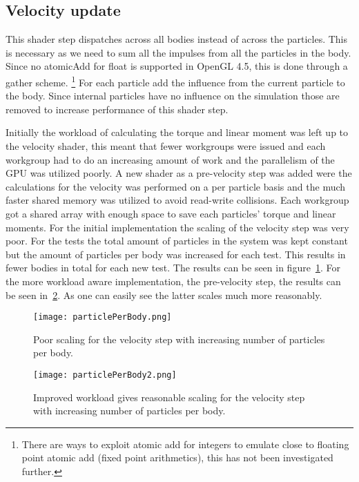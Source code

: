 \subsection{Velocity update}
This shader step dispatches across all bodies instead of across the particles. This
is necessary as we need to sum all the impulses from all the particles in the body.
Since no atomicAdd for float is supported in OpenGL 4.5, this is done through a gather scheme.
\footnote{There are ways to exploit atomic add for integers to emulate close to floating point atomic add (fixed point arithmetics), this has not been investigated further.}
For each particle add the influence from the current particle to the body.
Since internal particles have no influence on the simulation
those are removed to increase performance of this shader step.

Initially the workload of calculating the torque and linear moment was left up to the velocity shader,
this meant that fewer workgroups were issued and each workgroup had to do an increasing
amount of work and the parallelism of the GPU was utilized poorly. A new shader as
a pre-velocity step was added were the calculations for the velocity was performed
on a per particle basis and the much faster shared memory was utilized to avoid
read-write collisions. Each workgroup got a shared array with enough space to save
each particles' torque and linear moments. For the initial implementation the scaling of
the velocity step was very poor. For the tests the total amount of particles in the
system was kept constant but the amount of particles per body was increased for each test.
This results in fewer bodies in total for each new test. The results can be seen in figure~\ref{fig:velScale1}.
For the more workload aware implementation, the pre-velocity step, the results can be seen in~\ref{fig:velScale2}.
As one can easily see the latter scales much more reasonably.

\begin{figure}[H]
  \centering
  \texttt{[image: particlePerBody.png]}
  \caption{Poor scaling for the velocity step with increasing number of particles per body.}
  \label{fig:velScale1}
\end{figure}

\begin{figure}[H]
  \centering
  \texttt{[image: particlePerBody2.png]}
  \caption{Improved workload gives reasonable scaling for the velocity step with increasing number of particles per body.}
  \label{fig:velScale2}
\end{figure}

